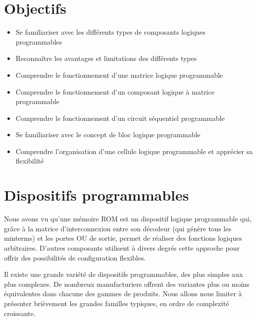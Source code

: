 \documentclass[letter, oneside]{book}
\begin{document}
\section{Objectifs}
\label{sec:orgd42642f}
\begin{itemize}
\item Se familiariser avec les différents types de composants logiques
programmables
\item Reconnaître les avantages et limitations des différents types
\item Comprendre le fonctionnement d'une matrice logique programmable
\item Comprendre le fonctionnement d'un composant logique à matrice programmable
\item Comprendre le fonctionnement d'un circuit séquentiel programmable
\item Se familiariser avec le concept de bloc logique programmable
\item Comprendre l'organisation d'une cellule logique programmable et
apprécier sa flexibilité
\end{itemize}

\section{Dispositifs programmables}
\label{sec:orge602489}

Nous avons vu qu'une mémoire ROM est un dispositif logique
programmable qui, grâce à la matrice d'interconnexion entre son
décodeur (qui génère tous les minterms) et les portes OU de sortie,
permet de réaliser des fonctions logiques arbitraires. D'autres
composants utilisent à divers degrés cette approche pour offrir des
possibilités de configuration flexibles.

Il existe une grande variété de dispositifs programmables, des plus
simples aux plus complexes. De nombreux manufacturiers offrent des
variantes plus ou moins équivalentes dans chacune des gammes de
produits. Nous allons nous limiter à présenter brièvement les grandes
familles typiques, en ordre de complexité croissante.
\end{document}
